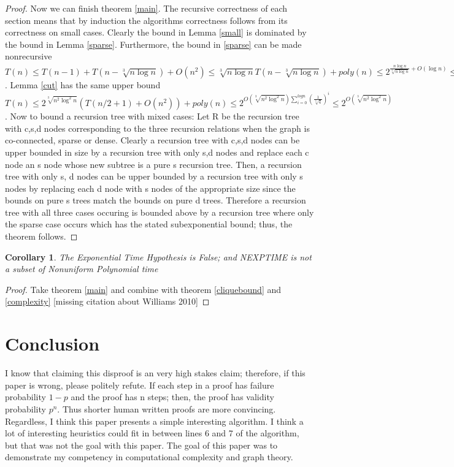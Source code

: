 \documentclass[12pt]{article}
\newtheorem{cor}[thm]{Corollary}
\begin{document}
\begin{proof}Now we can finish theorem \ref{main}. The recursive correctness of each section means that by induction the algorithms correctness follows from its correctness on small cases. Clearly the bound in Lemma \ref{small} is dominated by the bound in Lemma \ref{sparse}. Furthermore, the bound in \ref{sparse} can be made nonrecursive $T(n) \le T(n-1) + T(n-\sqrt[3]{n\log n}) + O(n^2) \le \sqrt[3]{n\log n} T(n- \sqrt[3]{n\log n}) + poly(n) \le 2^{\frac{n\log n}{ \sqrt[3]{n\log n}}+ O(\log n) } \le 2^{O(\sqrt[3]{n^2\log^2n})}$. Lemma \ref{cut} has the same upper bound $T(n) \le  2^{\sqrt[3]{n^2\log^2 n}}(T(n/2+1)+ O(n^2)) + poly(n) \le 2^{O(\sqrt[3]{n^2\log^2 n})\sum_{i=0}^{logn} (\frac{1}{\sqrt[3]{4}})^i} \le 2^{O(\sqrt[3]{n^2\log^2 n})}$. Now to bound a recursion tree with mixed cases: Let R be the recursion tree with c,s,d nodes corresponding to the three recursion relations when the graph is co-connected, sparse or dense. Clearly a recursion tree with c,s,d nodes can be upper bounded in size by a recursion tree with only s,d nodes and replace each c node an s node whose new subtree is a pure s recursion tree. Then, a recursion tree with only s, d nodes can be upper bounded by a recursion tree with only s nodes by replacing each d node with s nodes of the appropriate size since the bounds on pure s trees match the bounds on pure d trees. Therefore a recursion tree with all three cases occuring is bounded above by a recursion tree where only the sparse case occurs which has the stated subexponential bound; thus, the theorem follows.
\end{proof}
\begin{cor} The Exponential Time Hypothesis is False; and NEXPTIME is not a subset of Nonuniform Polynomial time\end{cor}
\begin{proof} Take theorem \ref{main} and combine with theorem \ref{cliquebound} and \ref{complexity} [missing citation about Williams 2010] \end{proof}
\section{Conclusion}
I know that claiming this disproof is an very high stakes claim; therefore, if this paper is wrong, please politely refute. If each step in a proof has failure probability $1-p$ and the proof has n steps; then, the proof has validity probability $p^n$. Thus shorter human written proofs are more convincing. Regardless, I think this paper presents a simple interesting algorithm. I think a lot of interesting heuristics could fit in between lines 6 and 7 of the algorithm, but that was not the goal with this paper. The goal of this paper was to demonstrate my competency in computational complexity and graph theory.


\end{document}
